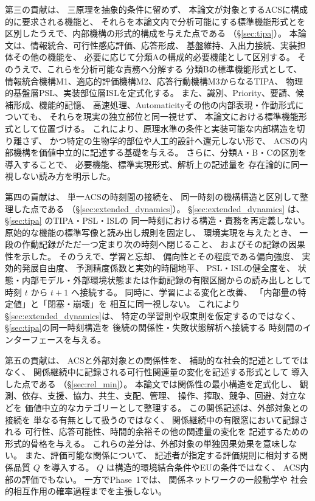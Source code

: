 第三の貢献は、
三原理を抽象的条件に留めず、
本論文が対象とするACSに構成的に要求される機能と、
それらを本論文内で分析可能にする標準機能形式とを
区別したうえで、内部機構の形式的構成を与えた点である
（\S\ref{sec:tipa}）。
本論文は、情報統合、可行性感応評価、応答形成、
基盤維持、入出力接続、実装担体その他の機能を、
必要に応じて分類Aの構成的必要機能として区別する。
そのうえで、これらを分析可能な責務へ分解する
分類Bの標準機能形式として、
情報統合機構M1、適応的評価機構M2、応答行動機構M3からなるTIPA、
物理的基盤層PSL、実装部位層ISLを定式化する。
また、識別、Priority、要請、候補形成、機能的記憶、
高速処理、Automaticityその他の内部表現・作動形式についても、
それらを現実の独立部位と同一視せず、
本論文における標準機能形式として位置づける。
これにより、原理水準の条件と実装可能な内部構造を切り離さず、
かつ特定の生物学的部位や人工的設計へ還元しない形で、
ACSの内部機構を価値中立的に記述する基礎を与える。
さらに、分類A・B・Cの区別を導入することで、
必要機能、標準実現形式、解析上の記述量を
存在論的に同一視しない読み方を明示した。

第四の貢献は、
単一ACSの時刻間の接続を、
同一時刻の機構構造と区別して整理した点である
（\S\ref{sec:extended_dynamics}）。
\S\ref{sec:extended_dynamics} は、
\S\ref{sec:tipa} のTIPA・PSL・ISLの
同一時刻における構造・責務を再定義しない。
原始的な機能の標準写像と読み出し規則を固定し、
環境実現を与えたとき、
一段の作動記録がただ一つ定まり次の時刻へ閉じること、
およびその記録の因果性を示した。
そのうえで、学習と忘却、
偏向性とその程度である偏向強度、
実効的発展自由度、
予測精度係数と実効的時間地平、
PSL・ISLの健全度を、
状態・内部モデル・外部環境状態または作動記録の有限区間からの読み出しとして時刻 $t$ から $t+1$ へ接続する。
同時に、学習による変化と改善、
「内部量の特定値」と「閉塞・崩壊」を
相互に同一視しない。
これにより\S\ref{sec:extended_dynamics}は、
特定の学習則や収束則を仮定するのではなく、
\S\ref{sec:tipa}の同一時刻構造を
後続の関係性・失敗状態解析へ接続する
時刻間のインターフェースを与える。

第五の貢献は、
ACSと外部対象との関係性を、
補助的な社会的記述としてではなく、
関係継続中に記録される可行性関連量の変化を記述する形式として
導入した点である
（\S\ref{sec:rel_min}）。
本論文では関係性の最小構造を定式化し、
観測、依存、支援、協力、共生、支配、管理、
操作、搾取、競争、回避、対立などを
価値中立的なカテゴリーとして整理する。
この関係記述は、外部対象との接続を
単なる有無として扱うのではなく、
関係継続中の有限窓において記録される
可行性、応答可能性、時間的余裕その他の関連量の変化を
記述するための形式的骨格を与える。
これらの差分は、外部対象の単独因果効果を意味しない。
また、評価可能な関係について、
記述者が指定する評価規則に相対する関係品質 $Q$ を導入する。
$Q$ は構造的環境結合条件やEUの条件ではなく、
ACS内部の評価でもない。
一方でPhase~1では、
関係ネットワークの一般動学や
社会的相互作用の確率過程までを主張しない。

